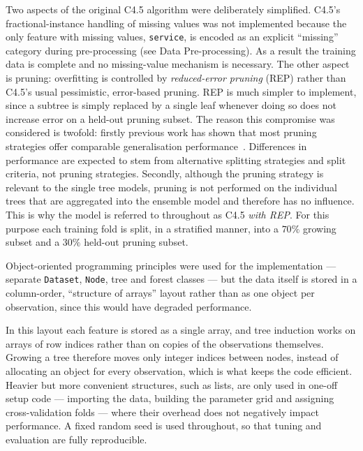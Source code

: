 \documentclass[conference]{IEEEtran}
\begin{document}
Two aspects of the original C4.5 algorithm \cite{quinlan1993c45} were deliberately simplified. C4.5's fractional-instance
handling of missing values was not implemented because the only feature with missing values,
\texttt{service}, is encoded as an explicit ``missing'' category during pre-processing (see
Data Pre-processing). As a result the training data is complete and no missing-value mechanism is
necessary. The other aspect is pruning: overfitting is controlled by \emph{reduced-error pruning} (REP) rather than
C4.5's usual pessimistic, error-based pruning. REP is much simpler to implement, since a
subtree is simply replaced by a single leaf whenever doing so does not increase error on a held-out
pruning subset. The reason this compromise was considered is twofold: firstly previous work has shown 
that most pruning strategies offer comparable generalisation performance~\cite{esposito1997}. Differences in performance
are expected to stem from alternative splitting strategies and split criteria, not pruning strategies. 
Secondly, although the pruning strategy is relevant to the single tree models, pruning is not performed
on the individual trees that are aggregated into the ensemble model and therefore has no influence.
This is why the model is referred to throughout as C4.5 \emph{with REP}. For this
purpose each training fold is split, in a stratified manner, into a $70\%$ growing subset and
a $30\%$ held-out pruning subset.

Object-oriented programming principles were used for the implementation --- separate \texttt{Dataset},
\texttt{Node}, tree and forest classes --- but the data itself is stored in a column-order,
``structure of arrays'' layout rather than as one object per observation, since this would
have degraded performance.

In this layout each feature is stored as a single array, and tree induction works on arrays of
row indices rather than on copies of the observations themselves. Growing a tree therefore moves
only integer indices between nodes, instead of allocating an object for every
observation, which is what keeps the code efficient. Heavier
but more convenient structures, such as lists, are only used in one-off setup code --- importing
the data, building the parameter grid and assigning cross-validation folds --- where their overhead 
does not negatively impact performance. A fixed random seed is used throughout, so that tuning and 
evaluation are fully reproducible.
\end{document}
